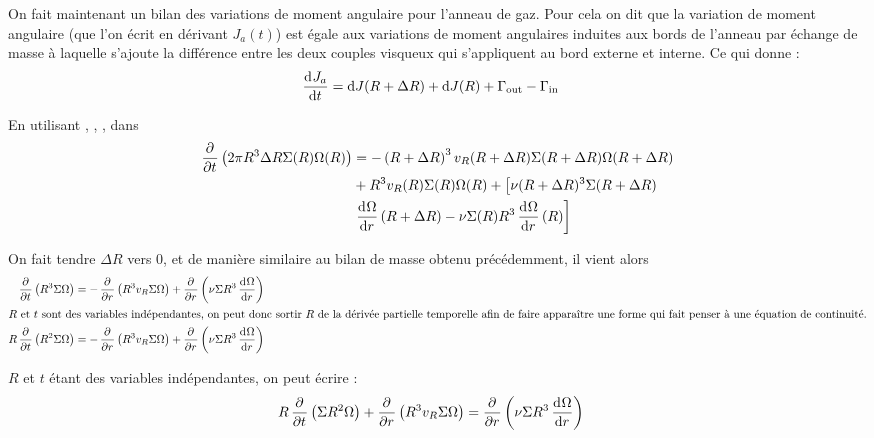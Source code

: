 \bigskip

On fait maintenant un bilan des variations de moment angulaire pour l'anneau de gaz. Pour cela on dit que la variation de moment angulaire (que l'on écrit en dérivant $J_a(t)$) est égale aux variations de moment angulaires induites aux bords de l'anneau par échange de masse à laquelle s'ajoute la différence entre les deux couples visqueux qui s'appliquent au bord externe et interne. Ce qui donne : 
\begin{align}
\mathinner{ \dfrac{\operatorname{d \!}{^{}}J_a}{\operatorname{d \!}{{t}^{}}} } &= \operatorname{d \!} J(R+\Delta R) + \operatorname{d \!} J(R) + \Gamma_\text{out} - \Gamma_\text{in}\label{eq:cons_J_a2}
\end{align}

En utilisant , , , dans 
\begin{align*}
\begin{split}
\mathinner{ \dfrac{\partial{^{}}}{\partial{{t}^{}}} }\left(2\pi R^3 \Delta R \Sigma(R)\Omega(R)\right) &= -\left(R+\Delta R\right)^3v_R(R+\Delta R) \Sigma(R+\Delta R) \Omega(R+\Delta R)\\
& + R^3 v_R(R) \Sigma(R) \Omega(R) + \left[\nu(R+\Delta R)^3\Sigma(R+\Delta R)\right.\\
&\left. \mathinner{ \dfrac{\operatorname{d \!}{^{}}\Omega}{\operatorname{d \!}{{r}^{}}} }(R+\Delta R)-\nu \Sigma(R) R^3 \mathinner{ \dfrac{\operatorname{d \!}{^{}}\Omega}{\operatorname{d \!}{{r}^{}}} }(R)\right]
\end{split}
\end{align*}



On fait tendre $\Delta R$ vers 0, et de manière similaire au bilan de masse obtenu précédemment, il vient alors 
\begin{align*}
\mathinner{ \dfrac{\partial{^{}}}{\partial{{t}^{}}} }\left(R^3 \Sigma\Omega\right) &= -\mathinner{ \dfrac{\partial{^{}}}{\partial{{r}^{}}} }\left(R^3 v_R \Sigma \Omega\right) + \mathinner{ \dfrac{\partial{^{}}}{\partial{{r}^{}}} }\left(\nu \Sigma R^3 \mathinner{ \dfrac{\operatorname{d \!}{^{}}\Omega}{\operatorname{d \!}{{r}^{}}} }\right)\\
\intertext{$R$ et $t$ sont des variables indépendantes, on peut donc sortir $R$ de la dérivée partielle temporelle afin de faire apparaître une forme qui fait penser à une équation de continuité.}
R\mathinner{ \dfrac{\partial{^{}}}{\partial{{t}^{}}} }\left(R^2 \Sigma\Omega\right) &= -\mathinner{ \dfrac{\partial{^{}}}{\partial{{r}^{}}} }\left(R^3 v_R \Sigma \Omega\right) + \mathinner{ \dfrac{\partial{^{}}}{\partial{{r}^{}}} }\left(\nu \Sigma R^3 \mathinner{ \dfrac{\operatorname{d \!}{^{}}\Omega}{\operatorname{d \!}{{r}^{}}} }\right)
\end{align*}

$R$ et $t$ étant des variables indépendantes, on peut écrire :
\begin{align}
R\mathinner{ \dfrac{\partial{^{}}}{\partial{{t}^{}}} }\left(\Sigma R^2\Omega\right) + \mathinner{ \dfrac{\partial{^{}}}{\partial{{r}^{}}} }\left(R^3 v_R \Sigma \Omega\right) &= \mathinner{ \dfrac{\partial{^{}}}{\partial{{r}^{}}} }\left(\nu \Sigma R^3 \mathinner{ \dfrac{\operatorname{d \!}{^{}}\Omega}{\operatorname{d \!}{{r}^{}}} }\right)\label{eq:ang_mom_01}
\end{align}

